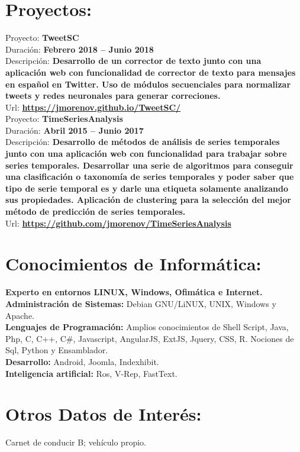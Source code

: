 \documentclass	[10pt,a4paper,oneside]{article}
\newcommand{\seccion}[1]{\vspace*{3mm}\section*{#1}\vspace*{-3mm}}
\begin{document}
\seccion{Proyectos:}

Proyecto: \textbf{TweetSC}\\
Duración: \textbf{Febrero 2018 – Junio 2018}\\
Descripción: \textbf{Desarrollo de un corrector de texto junto con una aplicación web con funcionalidad de corrector de texto para mensajes en español en Twitter. Uso de módulos secuenciales para normalizar tweets y redes neuronales para generar correciones.}\\
Url: \textbf{\url{https://jmorenov.github.io/TweetSC/}}\\

Proyecto: \textbf{TimeSeriesAnalysis}\\
Duración: \textbf{Abril 2015 – Junio 2017}\\
Descripción: \textbf{Desarrollo de métodos de análisis de series temporales junto con una aplicación web con funcionalidad para trabajar sobre series temporales. Desarrollar una serie de algoritmos para conseguir una clasificación o taxonomía de series temporales y poder saber que tipo de serie temporal es y darle una etiqueta solamente analizando sus propiedades. Aplicación de clustering para la selección del mejor método de predicción de series temporales.}\\
Url: \textbf{\url{https://github.com/jmorenov/TimeSeriesAnalysis}}

\seccion{Conocimientos de Informática:}
\textbf{Experto en entornos LINUX, Windows, Ofimática e Internet.}\\
\textbf{Administración de Sistemas:} Debian GNU/LiNUX, UNIX, Windows y Apache.\\
\textbf{Lenguajes de Programación:} Amplios conocimientos de Shell Script, Java, Php, C,
C++, C\#, Javascript, AngularJS, ExtJS, Jquery, CSS, R. Nociones de Sql, Python y Ensamblador.\\
\textbf{Desarrollo:} Android, Joomla, Indexhibit.\\
\textbf{Inteligencia artificial:} Ros, V-Rep, FastText.

\seccion{Otros Datos de Interés:}
Carnet de conducir B; vehículo propio.\\
\end{document}
